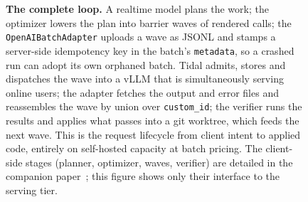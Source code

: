 \begin{figure}[t]
\caption[The complete loop with lazycode]{%
  \textbf{The complete loop.} A realtime model plans the work; the optimizer lowers the
  plan into barrier waves of rendered calls; the \texttt{OpenAIBatchAdapter} uploads a
  wave as JSONL and stamps a server-side idempotency key in the batch's
  \texttt{metadata}, so a crashed run can adopt its own orphaned batch. Tidal admits,
  stores and dispatches the wave into a vLLM that is simultaneously serving online users;
  the adapter fetches the output and error files and reassembles the wave by union over
  \texttt{custom\_id}; the verifier runs the results and applies what passes into a git
  worktree, which feeds the next wave. This is the request lifecycle from client intent
  to applied code, entirely on self-hosted capacity at batch pricing. The client-side
  stages (planner, optimizer, waves, verifier) are detailed in the companion
  paper~\citep{lazycode-paper}; this figure shows only their interface to the serving
  tier.}
\label{fig:loop}
\end{figure}
